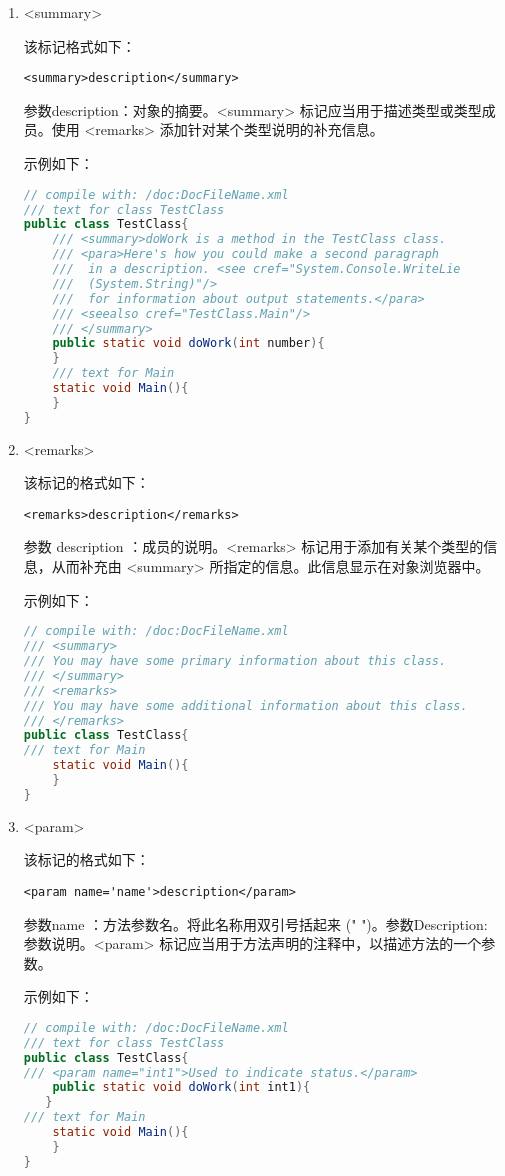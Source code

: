 \begin{enumerate}
\item <summary>

该标记格式如下：
\begin{lstlisting}
<summary>description</summary>
\end{lstlisting}
参数description：对象的摘要。<summary> 标记应当用于描述类型或类型成员。使用 <remarks> 添加针对某个类型说明的补充信息。

示例如下：
\begin{lstlisting}[language=java]
// compile with: /doc:DocFileName.xml 
/// text for class TestClass
public class TestClass{
    /// <summary>doWork is a method in the TestClass class.
    /// <para>Here's how you could make a second paragraph 
    ///  in a description. <see cref="System.Console.WriteLie
    ///  (System.String)"/> 
    ///  for information about output statements.</para>
    /// <seealso cref="TestClass.Main"/>
    /// </summary>
    public static void doWork(int number){ 
    }
    /// text for Main
    static void Main(){ 
    }
}
\end{lstlisting}

\item <remarks>

该标记的格式如下：
\begin{lstlisting}
<remarks>description</remarks>
\end{lstlisting}
参数 description ：成员的说明。<remarks> 标记用于添加有关某个类型的信息，从而补充由 <summary> 所指定的信息。此信息显示在对象浏览器中。

示例如下：
\begin{lstlisting}[language=java]
// compile with: /doc:DocFileName.xml 
/// <summary>
/// You may have some primary information about this class.
/// </summary>
/// <remarks>
/// You may have some additional information about this class.
/// </remarks>
public class TestClass{
/// text for Main
    static void Main(){ 
    }
}
\end{lstlisting}

\item <param>

该标记的格式如下：
\begin{lstlisting}
<param name='name'>description</param>
\end{lstlisting}
参数name ：方法参数名。将此名称用双引号括起来 (" ")。参数Description: 参数说明。<param> 标记应当用于方法声明的注释中，以描述方法的一个参数。

示例如下：
\begin{lstlisting}[language=java]
// compile with: /doc:DocFileName.xml 
/// text for class TestClass
public class TestClass{
/// <param name="int1">Used to indicate status.</param>
    public static void doWork(int int1){ 
   }
/// text for Main
    static void Main(){ 
    }
}
\end{lstlisting}


\end{enumerate}
